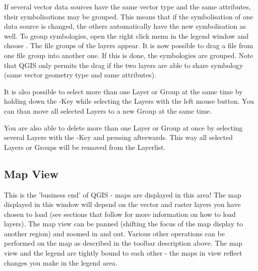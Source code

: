 If several vector data sources have the same vector type and the same
attributes, their symbolisations may be grouped. This means that if the
symbolisation of one data source is changed, the others automatically have
the new symbolisation as well. To group symbologies, open the right click
menu in the legend window and choose . The file
groups of the layers appear. It is now possible to drag a file from one file
group into another one. If this is done, the symbologies are grouped. Note
that QGIS only permits the drag if the two layers are able to share
symbology (same vector geometry type and same attributes).

It is also possible to select more than one Layer or Group at the same time 
by holding down the -Key while selecting the Layers with the 
left mouse button. You can than move all selected Layers to a new Group at 
the same time.

You are also able to delete more than one Layer or Group at once by selecting 
several Layers with the -Key and pressing  afterwards.
This way all selected Layers or Groups will be removed from the Layerlist.

%

\subsection{Map View}\label{label_mapview}

This is the 'business end' of QGIS - maps are displayed in this area! The
map displayed in this window will depend on the vector and raster layers you
have chosen to load (see sections that follow for more information on how to
load layers). The map view can be panned (shifting the focus of the map display
to another region) and zoomed in and out. Various other operations can be
performed on the map as described in the toolbar description above.  The map
view and the legend are tightly bound to each other - the maps in view reflect
changes you make in the legend area.


